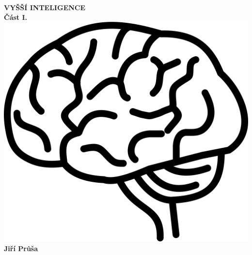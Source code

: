 \documentclass[a5paper,twoside,12pt]{article}
\renewcommand{\headrulewidth}{0pt}
\begin{document}
\thispagestyle{empty}
\vspace*{\fill}
\begin{center}
	\Huge \textbf{\textsf{VYŠŠÍ INTELIGENCE}}\\
	\vspace*{.5em}
	\huge \textbf{\textsf{Část I.}}\\
	\vspace*{2em}
	\includegraphics[width=.5\textwidth]{brain-line-icon}\\
	\vspace*{2em}
	\huge \textbf{\textsf{Jiří Průša}}
\end{center}
\vspace*{\fill}
\clearpage

\pagestyle{fancy}
\renewcommand{\headrulewidth}{.5pt}

\lipsum[1-10]
\end{document}
